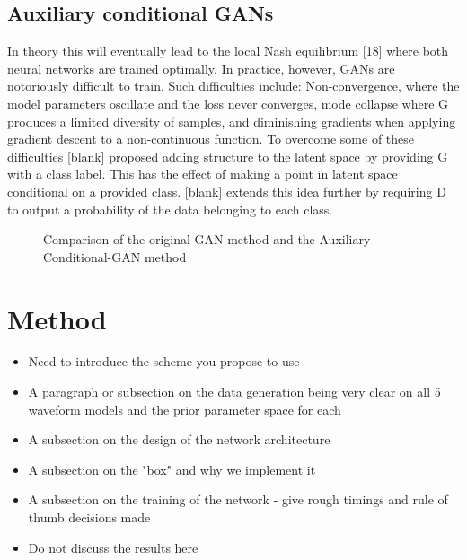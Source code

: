 \documentclass[12pt]{iopart}
\begin{document}
\subsection{Auxiliary conditional GANs}
In theory this will eventually lead to the local Nash equilibrium [18] where
both neural networks are trained optimally. In practice, however, GANs are
notoriously difficult to train. Such difficulties include: Non-convergence,
where the model parameters oscillate and the loss never converges, mode
collapse where G produces a limited diversity of samples, and diminishing
gradients when applying gradient descent to a
non-continuous function. To overcome some of these difficulties [blank]
proposed adding structure to the latent space by providing G with a class
label. This has the effect of making a point in latent space conditional on a
provided class. [blank] extends this idea further by requiring D to output a
probability of the data belonging to each class. 

\begin{figure}[h!]
    \centering
    \caption{Comparison of the original GAN method and the Auxiliary Conditional-GAN method }
\end{figure}

\section{Method}

\begin{itemize}
\item Need to introduce the scheme you propose to use
\item A paragraph or subsection on the data generation being very clear on all
5 waveform models and the prior parameter space for each 
\item A subsection on the design of the network architecture 
\item A subsection on the "box" and why we implement it 
\item A subsection on the training of the network - give rough timings and rule
of thumb decisions made
\item Do not discuss the results here 
\end{itemize}
\end{document}
